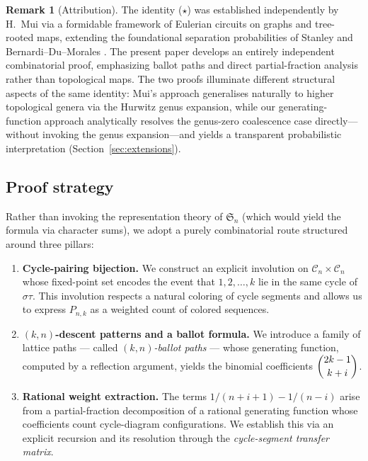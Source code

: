 \documentclass[12pt,a4paper]{article}
\theoremstyle{definition}
\newtheorem{remark}[theorem]{Remark}
\newcommand{\Sn}{\mathfrak{S}_n}
\newcommand{\Cn}{\mathcal{C}_n}
\renewcommand{\binom}[2]{\dbinom{#1}{#2}}
\begin{document}
\begin{remark}[Attribution]
\label{rem:attribution}
The identity ($\star$) was established independently by H.\ Mui
\cite{Mui2024} via a formidable framework of Eulerian circuits on
graphs and tree-rooted maps, extending the foundational separation
probabilities of Stanley \cite{Stanley2001} and Bernardi--Du--Morales
\cite{BernardiDuMorales2019}.  The present paper develops an entirely
independent combinatorial proof, emphasizing ballot paths and
direct partial-fraction analysis rather than topological maps.
The two proofs illuminate different structural aspects of the same
identity: Mui's approach generalises naturally to higher topological
genera via the Hurwitz genus expansion, while our generating-function
approach analytically resolves the genus-zero coalescence case
directly---without invoking the genus expansion---and yields a
transparent probabilistic interpretation
(Section~\ref{sec:extensions}).
\end{remark}

\subsection{Proof strategy}

Rather than invoking the representation theory of $\Sn$ (which would
yield the formula via character sums), we adopt a purely combinatorial
route structured around three pillars:

\begin{enumerate}[label=\textbf{P\arabic*.}]
\item \textbf{Cycle-pairing bijection.}  We construct an explicit
  involution on $\Cn\times\Cn$ whose fixed-point set encodes the
  event that $1,2,\dots,k$ lie in the same cycle of $\sigma\tau$.
  This involution respects a natural coloring of cycle segments and
  allows us to express $P_{n,k}$ as a weighted count of colored
  sequences.

\item \textbf{$(k,n)$-descent patterns and a ballot formula.}  We
  introduce a family of lattice paths — called \emph{$(k,n)$-ballot
  paths} — whose generating function, computed by a reflection
  argument, yields the binomial coefficients $\binom{2k-1}{k+i}$.

\item \textbf{Rational weight extraction.}  The terms
  $1/(n+i+1)-1/(n-i)$ arise from a partial-fraction decomposition of a
  rational generating function whose coefficients count cycle-diagram
  configurations.  We establish this via an explicit recursion and its
  resolution through the \emph{cycle-segment transfer matrix}.
\end{enumerate}
\end{document}
